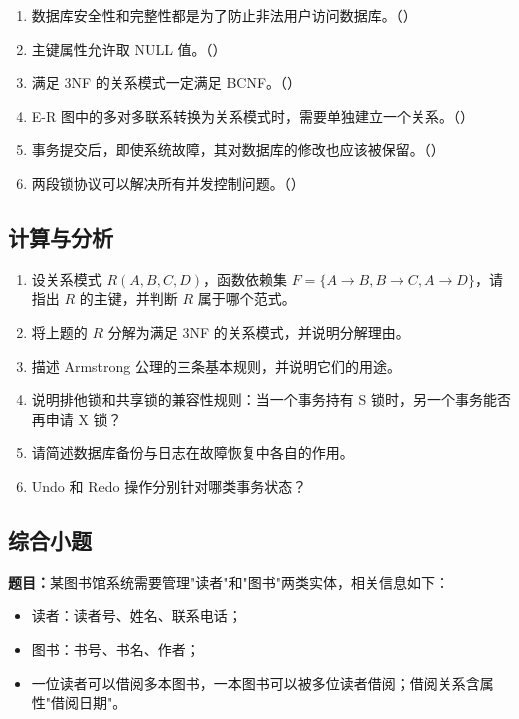\documentclass{../../note}
\begin{document}
\begin{enumerate}
  \item 数据库安全性和完整性都是为了防止非法用户访问数据库。（\hspace{1cm}）
  \item 主键属性允许取 NULL 值。（\hspace{1cm}）
  \item 满足 3NF 的关系模式一定满足 BCNF。（\hspace{1cm}）
  \item E-R 图中的多对多联系转换为关系模式时，需要单独建立一个关系。（\hspace{1cm}）
  \item 事务提交后，即使系统故障，其对数据库的修改也应该被保留。（\hspace{1cm}）
  \item 两段锁协议可以解决所有并发控制问题。（\hspace{1cm}）
\end{enumerate}

\subsection{计算与分析}

\begin{enumerate}
  \item 设关系模式 $R(A, B, C, D)$，函数依赖集 $F = \{A \to B, B \to C, A \to D\}$，请指出 $R$ 的主键，并判断 $R$ 属于哪个范式。
  \item 将上题的 $R$ 分解为满足 3NF 的关系模式，并说明分解理由。
  \item 描述 Armstrong 公理的三条基本规则，并说明它们的用途。
  \item 说明排他锁和共享锁的兼容性规则：当一个事务持有 S 锁时，另一个事务能否再申请 X 锁？
  \item 请简述数据库备份与日志在故障恢复中各自的作用。
  \item Undo 和 Redo 操作分别针对哪类事务状态？
\end{enumerate}

\subsection{综合小题}

\textbf{题目：}某图书馆系统需要管理"读者"和"图书"两类实体，相关信息如下：

\begin{itemize}
  \item 读者：读者号、姓名、联系电话；
  \item 图书：书号、书名、作者；
  \item 一位读者可以借阅多本图书，一本图书可以被多位读者借阅；借阅关系含属性"借阅日期"。
\end{itemize}
\end{document}
